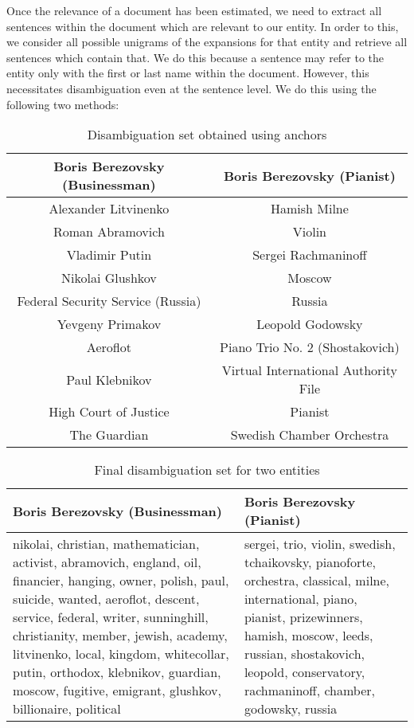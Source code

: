 Once the relevance of a document has been estimated, we need to extract all sentences within the document which are relevant to our entity. In order to this, we consider all possible unigrams of the expansions for that entity and retrieve all sentences which contain that. We do this because a sentence may refer to the entity only with the first or last name within the document. However, this necessitates disambiguation even at the sentence level. We do this using the following two methods:

\begin{table*}[ht]
\centering
\begin{tabular}{|c|c|}
\hline
Boris Berezovsky (Businessman) & Boris Berezovsky (Pianist) \\
\hline
Alexander Litvinenko & Hamish Milne \\
Roman Abramovich & Violin \\
Vladimir Putin & Sergei Rachmaninoff \\
Nikolai Glushkov & Moscow \\
Federal Security Service (Russia) & Russia \\
Yevgeny Primakov & Leopold Godowsky \\
Aeroflot & Piano Trio No. 2 (Shostakovich) \\
Paul Klebnikov & Virtual International Authority File \\
High Court of Justice & Pianist \\
The Guardian & Swedish Chamber Orchestra \\
\hline
\end{tabular}
\caption{Disambiguation set obtained using anchors}
\label{tab:disamb_anchors}
\end{table*}


\begin{table*}[ht]
\centering
\begin{tabular}{|p{7cm}|p{7cm}|}
\hline
Boris Berezovsky (Businessman) & Boris Berezovsky (Pianist) \\
\hline
nikolai, christian, mathematician, activist, abramovich, england, oil, financier, hanging, owner, polish, paul, suicide, wanted, aeroflot, descent, service, federal, writer, sunninghill, christianity, member, jewish, academy, litvinenko, local, kingdom, whitecollar, putin, orthodox, klebnikov, guardian, moscow, fugitive, emigrant, glushkov, billionaire, political & sergei, trio, violin, swedish, tchaikovsky, pianoforte, orchestra, classical, milne, international, piano, pianist, prizewinners, hamish, moscow, leeds, russian, shostakovich, leopold, conservatory, rachmaninoff, chamber, godowsky, russia \\
\hline
\end{tabular}
\caption{Final disambiguation set for two entities}
\label{tab:disamb_final}
\end{table*}

